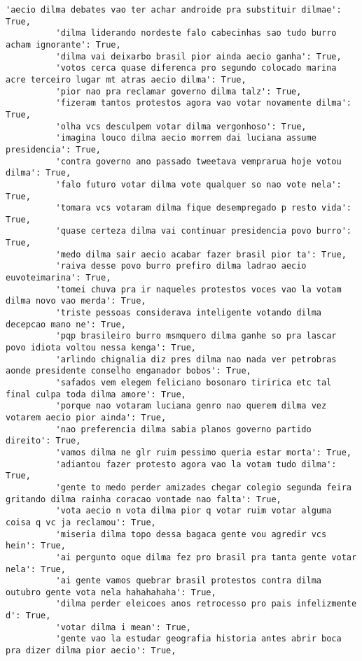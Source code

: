 \documentclass[11pt]{article}
\begin{document}
\begin{Verbatim}[commandchars=\\\{\}]
          'aecio dilma debates vao ter achar androide pra substituir dilmae': True,
          'dilma liderando nordeste falo cabecinhas sao tudo burro acham ignorante': True,
          'dilma vai deixarbo brasil pior ainda aecio ganha': True,
          'votos cerca quase diferenca pro segundo colocado marina acre terceiro lugar mt atras aecio dilma': True,
          'pior nao pra reclamar governo dilma talz': True,
          'fizeram tantos protestos agora vao votar novamente dilma': True,
          'olha vcs desculpem votar dilma vergonhoso': True,
          'imagina louco dilma aecio morrem dai luciana assume presidencia': True,
          'contra governo ano passado tweetava vemprarua hoje votou dilma': True,
          'falo futuro votar dilma vote qualquer so nao vote nela': True,
          'tomara vcs votaram dilma fique desempregado p resto vida': True,
          'quase certeza dilma vai continuar presidencia povo burro': True,
          'medo dilma sair aecio acabar fazer brasil pior ta': True,
          'raiva desse povo burro prefiro dilma ladrao aecio euvoteimarina': True,
          'tomei chuva pra ir naqueles protestos voces vao la votam dilma novo vao merda': True,
          'triste pessoas considerava inteligente votando dilma decepcao mano ne': True,
          'pqp brasileiro burro msmquero dilma ganhe so pra lascar povo idiota voltou nessa kenga': True,
          'arlindo chignalia diz pres dilma nao nada ver petrobras aonde presidente conselho enganador bobos': True,
          'safados vem elegem feliciano bosonaro tiririca etc tal final culpa toda dilma amore': True,
          'porque nao votaram luciana genro nao querem dilma vez votarem aecio pior ainda': True,
          'nao preferencia dilma sabia planos governo partido direito': True,
          'vamos dilma ne glr ruim pessimo queria estar morta': True,
          'adiantou fazer protesto agora vao la votam tudo dilma': True,
          'gente to medo perder amizades chegar colegio segunda feira gritando dilma rainha coracao vontade nao falta': True,
          'vota aecio n vota dilma pior q votar ruim votar alguma coisa q vc ja reclamou': True,
          'miseria dilma topo dessa bagaca gente vou agredir vcs hein': True,
          'ai pergunto oque dilma fez pro brasil pra tanta gente votar nela': True,
          'ai gente vamos quebrar brasil protestos contra dilma outubro gente vota nela hahahahaha': True,
          'dilma perder eleicoes anos retrocesso pro pais infelizmente d': True,
          'votar dilma i mean': True,
          'gente vao la estudar geografia historia antes abrir boca pra dizer dilma pior aecio': True,

\end{Verbatim}
\end{document}
